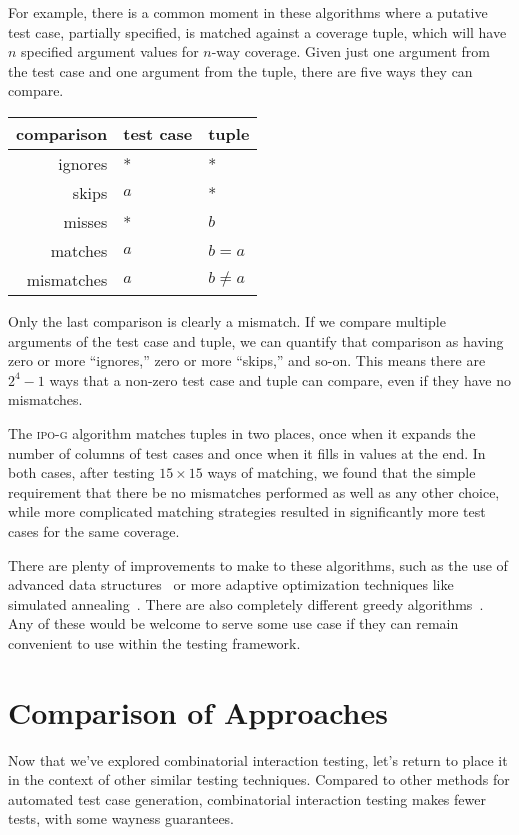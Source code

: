 \documentclass{juliacon}
\begin{document}
\vskip 6pt
For example, there is a common moment in these algorithms where a putative test case, partially specified, is matched against a coverage tuple, which will have $n$ specified argument values for $n$-way coverage. Given just one argument from the test case and one argument from the tuple, there are five ways they can compare.
\begin{center}
\begin{tabular}{rll}
comparison & test case & tuple \\ \hline
ignores & * & * \\
skips & $a$ & * \\
misses & * & $b$ \\
matches & $a$ & $b=a$ \\
mismatches & $a$ & $b\ne a$
\end{tabular}
\end{center}
Only the last comparison is clearly a mismatch. If we compare multiple arguments of the test case and tuple, we can quantify that comparison as having zero or more ``ignores,'' zero or more ``skips,'' and so-on. This means there are $2^4-1$ ways that a non-zero test case and tuple can compare, even if they have no mismatches.

\vskip 6pt
The \textsc{ipo-g} algorithm matches tuples in two places, once when it expands the number of columns of test cases and once when it fills in values at the end. In both cases, after testing $15\times 15$ ways of matching, we found that the simple requirement that there be no mismatches performed as well as any other choice, while more complicated matching strategies resulted in significantly more test cases for the same coverage.

\vskip 6pt
There are plenty of improvements to make to these algorithms, such as the use of advanced data structures~\cite{Segall2011-jv} or more adaptive optimization techniques like simulated annealing~\cite{Petke2015-ex}. There are also completely different greedy algorithms~\cite{Calvagna2012-ic,Koc2018-vs}. Any of these would be welcome to serve some use case if they can remain convenient to use within the testing framework.


\section{Comparison of Approaches}\label{sec:comparison}

Now that we've explored combinatorial interaction testing, let's return to place it in the context of other similar testing techniques. Compared to other methods for automated test case generation, combinatorial interaction testing makes fewer tests, with some wayness guarantees.
\end{document}

